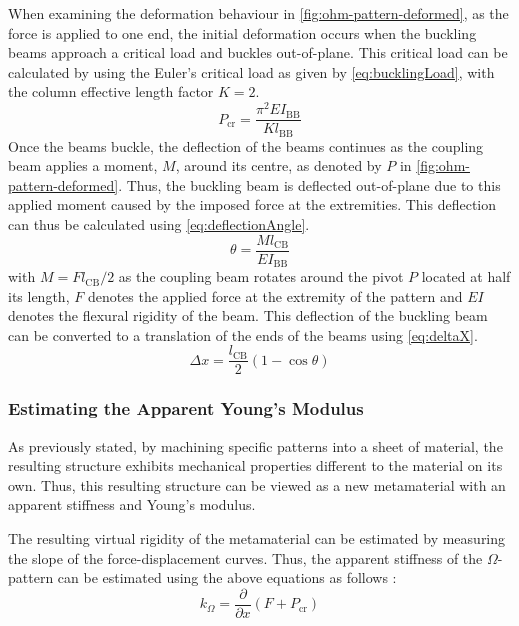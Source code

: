 When examining the deformation behaviour in \cref{fig:ohm-pattern-deformed}, as the force is applied to one end, the initial deformation occurs when the buckling beams approach a critical load and buckles out-of-plane. This critical load can be calculated by using the Euler's critical load as given by \eqref{eq:bucklingLoad}, with the column effective length factor $K=2$.
\begin{equation}\label{eq:bucklingLoad}
    P_\mathrm{cr} = \frac{\pi^2EI_\mathrm{BB}}{Kl_\mathrm{BB}}
\end{equation}
Once the beams buckle, the deflection of the beams continues as the coupling beam applies a moment, $M$, around its centre, as denoted by $P$ in \cref{fig:ohm-pattern-deformed}. Thus, the buckling beam is deflected out-of-plane due to this applied moment caused by the imposed force at the extremities. This deflection can thus be calculated using \eqref{eq:deflectionAngle}.
\begin{equation}\label{eq:deflectionAngle}
     \theta = \frac{Ml_\mathrm{CB}}{EI_\mathrm{BB}}
\end{equation}
with $M = Fl_\mathrm{CB}/2$ as the coupling beam rotates around the pivot $P$ located at half its length, $F$ denotes the applied force at the extremity of the pattern and $EI$ denotes the flexural rigidity of the beam. This deflection of the buckling beam can be converted to a translation of the ends of the beams using \eqref{eq:deltaX}.
\begin{equation}\label{eq:deltaX}
     \Delta x = \frac{l_\mathrm{CB}}{2}\left(1-\cos\theta\right)
\end{equation}

\subsubsection{Estimating the Apparent Young's Modulus}
As previously stated, by machining specific patterns into a sheet of material, the resulting structure exhibits mechanical properties different to the material on its own. Thus, this resulting structure can be viewed as a new metamaterial with an apparent stiffness and Young's modulus.

The resulting virtual rigidity of the metamaterial can be estimated by measuring the slope of the force-displacement curves. Thus, the apparent stiffness of the $\Omega$-pattern can be estimated using the above equations as follows :
\begin{equation}\label{eq:apparentStiffness}
    k_\Omega = \frac{\partial}{\partial x}(F+P_\mathrm{cr})
\end{equation}

